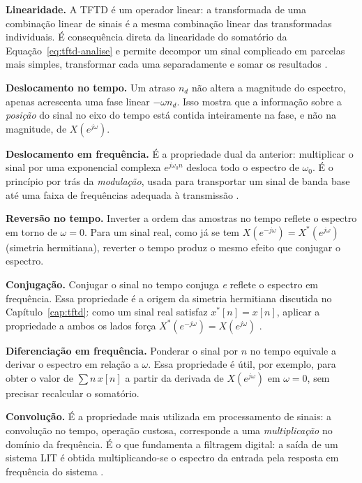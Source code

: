 \documentclass[
    12pt,
    openright,
    oneside,
    a4paper,
    chapter=TITLE,
    section=TITLE,
    brazil
]{abntex2}
\begin{document}
\begin{alineas}
\item \textbf{Linearidade.} A TFTD é um operador linear: a transformada de uma
combinação linear de sinais é a mesma combinação linear das transformadas individuais.
É consequência direta da linearidade do somatório da Equação~\eqref{eq:tftd-analise} e
permite decompor um sinal complicado em parcelas mais simples, transformar cada uma
separadamente e somar os resultados \cite{oppenheim2013}.

\item \textbf{Deslocamento no tempo.} Um atraso $n_d$ não altera a magnitude do
espectro, apenas acrescenta uma fase linear $-\omega n_d$. Isso mostra que a informação
sobre a \emph{posição} do sinal no eixo do tempo está contida inteiramente na fase, e não
na magnitude, de $X(e^{j\omega})$.

\item \textbf{Deslocamento em frequência.} É a propriedade dual da anterior: multiplicar
o sinal por uma exponencial complexa $e^{j\omega_0 n}$ desloca todo o espectro de
$\omega_0$. É o princípio por trás da \emph{modulação}, usada para transportar um sinal
de banda base até uma faixa de frequências adequada à transmissão \cite{haykin1999}.

\item \textbf{Reversão no tempo.} Inverter a ordem das amostras no tempo reflete o
espectro em torno de $\omega = 0$. Para um sinal real, como já se tem
$X(e^{-j\omega}) = X^{*}(e^{j\omega})$ (simetria hermitiana), reverter o tempo produz o
mesmo efeito que conjugar o espectro.

\item \textbf{Conjugação.} Conjugar o sinal no tempo conjuga \emph{e} reflete o espectro
em frequência. Essa propriedade é a origem da simetria hermitiana discutida no
Capítulo~\ref{cap:tftd}: como um sinal real satisfaz $x^{*}[n] = x[n]$, aplicar a
propriedade a ambos os lados força $X^{*}(e^{-j\omega}) = X(e^{j\omega})$
\cite{oppenheim1999}.

\item \textbf{Diferenciação em frequência.} Ponderar o sinal por $n$ no tempo equivale a
derivar o espectro em relação a $\omega$. Essa propriedade é útil, por exemplo, para obter
o valor de $\sum n\,x[n]$ a partir da derivada de $X(e^{j\omega})$ em $\omega = 0$, sem
precisar recalcular o somatório.

\item \textbf{Convolução.} É a propriedade mais utilizada em processamento de sinais:
a convolução no tempo, operação custosa, corresponde a uma \emph{multiplicação} no
domínio da frequência. É o que fundamenta a filtragem digital: a saída de um sistema
LIT é obtida multiplicando-se o espectro da entrada pela resposta em frequência do
sistema \cite{lathi2007}.


\end{alineas}
\end{document}

